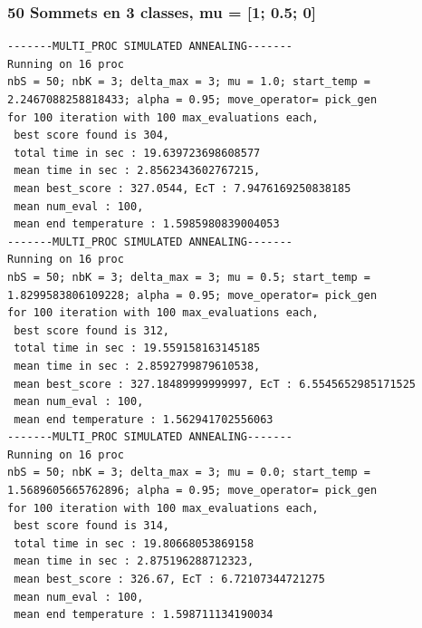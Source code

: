 \documentclass[a4paper]{article}
\begin{document}
\subsubsection{50 Sommets en 3 classes, mu = [1; 0.5; 0]}
\begin{verbatim}
-------MULTI_PROC SIMULATED ANNEALING-------
Running on 16 proc
nbS = 50; nbK = 3; delta_max = 3; mu = 1.0; start_temp = 2.2467088258818433; alpha = 0.95; move_operator= pick_gen
for 100 iteration with 100 max_evaluations each, 
 best score found is 304,
 total time in sec : 19.639723698608577
 mean time in sec : 2.8562343602767215,
 mean best_score : 327.0544, EcT : 7.9476169250838185
 mean num_eval : 100,
 mean end temperature : 1.5985980839004053
-------MULTI_PROC SIMULATED ANNEALING-------
Running on 16 proc
nbS = 50; nbK = 3; delta_max = 3; mu = 0.5; start_temp = 1.8299583806109228; alpha = 0.95; move_operator= pick_gen
for 100 iteration with 100 max_evaluations each, 
 best score found is 312,
 total time in sec : 19.559158163145185
 mean time in sec : 2.8592799879610538,
 mean best_score : 327.18489999999997, EcT : 6.5545652985171525
 mean num_eval : 100,
 mean end temperature : 1.562941702556063
-------MULTI_PROC SIMULATED ANNEALING-------
Running on 16 proc
nbS = 50; nbK = 3; delta_max = 3; mu = 0.0; start_temp = 1.5689605665762896; alpha = 0.95; move_operator= pick_gen
for 100 iteration with 100 max_evaluations each, 
 best score found is 314,
 total time in sec : 19.80668053869158
 mean time in sec : 2.875196288712323,
 mean best_score : 326.67, EcT : 6.72107344721275
 mean num_eval : 100,
 mean end temperature : 1.598711134190034
\end{verbatim}
\end{document}
